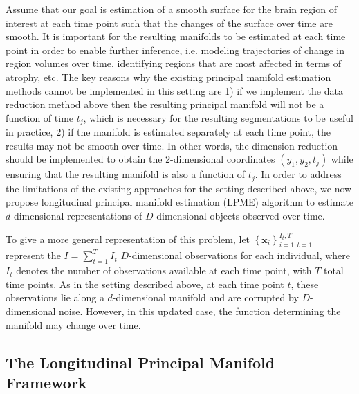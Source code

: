 \documentclass[11pt,reqno]{article}
\theoremstyle{definition}
\begin{document}
%
Assume that our goal is estimation of a smooth surface for the brain region of interest at each time point such that the changes of the surface over time are smooth. It is important for the resulting manifolds to be estimated at each time point in order to enable further inference, i.e. modeling trajectories of change in region volumes over time, identifying regions that are most affected in terms of atrophy, etc. The key reasons why the existing principal manifold estimation methods cannot be implemented in this setting are 1) if we implement the data reduction method above then the resulting principal manifold will not be a function of time $t_j$, which is necessary for the resulting segmentations to be useful in practice, 2) if the manifold is estimated separately at each time point, the results may not be smooth over time. In other words, the dimension reduction should be implemented to obtain the 2-dimensional coordinates $(y_1,y_2,t_j)$ while ensuring that the resulting manifold is also a function of $t_j$. In order to address the limitations of the existing approaches for the setting described above, we now propose longitudinal principal manifold estimation (LPME) algorithm to estimate $d$-dimensional representations of $D$-dimensional objects observed over time.

To give a more general representation of this problem, let $\left\{\bm{x}_i\right\}_{i=1, t=1}^{I_t, T}$ represent the $I = \sum_{t=1}^{T}I_t$ $D$-dimensional observations for each individual, where $I_t$ denotes the number of observations available at each time point, with $T$ total time points. As in the setting described above, at each time point $t$, these observations lie along a $d$-dimensional manifold and are corrupted by $D$-dimensional noise. However, in this updated case, the function determining the manifold may change over time.

\subsection{The Longitudinal Principal Manifold Framework}
\end{document}
